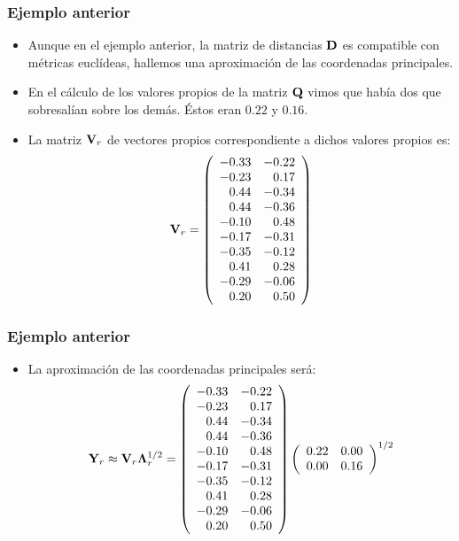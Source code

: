 \begin{frame}
\frametitle{Ejemplo anterior}
\begin{itemize}
\item<2->{Aunque en el ejemplo anterior, la matriz de distancias $\mathbf{D}$ es compatible con métricas euclídeas, hallemos una aproximación de las coordenadas principales.}
\item<3->{En el cálculo de los valores propios de la matriz $\mathbf{Q}$ vimos que había dos que sobresalían sobre los demás. Éstos eran $0.22$ y $0.16$.}
\item<4->{La matriz $\mathbf{V}_r$ de vectores propios correspondiente a dichos valores propios es:
{\small $$\mathbf{V}_r =
\left(\begin{array}{rr}
-0.33 & -0.22 \\
-0.23 & 0.17 \\
0.44 & -0.34 \\
0.44 & -0.36 \\
-0.10 & 0.48 \\
-0.17 & -0.31 \\
-0.35 & -0.12 \\
0.41 & 0.28 \\
-0.29 & -0.06 \\
0.20 & 0.50 \\
\end{array}\right)
$$}
}
\end{itemize}
\end{frame}

\begin{frame}
\frametitle{Ejemplo anterior}
\begin{itemize}
\item<2->{La aproximación de las coordenadas principales será:
$$
\mathbf{Y}_r \approx \mathbf{V}_r\mathbf{\Lambda}_r^{1/2} =\left(\begin{array}{rr}
-0.33 & -0.22 \\
-0.23 & 0.17 \\
0.44 & -0.34 \\
0.44 & -0.36 \\
-0.10 & 0.48 \\
-0.17 & -0.31 \\
-0.35 & -0.12 \\
0.41 & 0.28 \\
-0.29 & -0.06 \\
0.20 & 0.50 \\
\end{array}\right) \left(\begin{array}{rr}
0.22 & 0.00 \\ 0.00 & 0.16
\end{array}\right)^{1/2}
$$}
\end{itemize}
\end{frame}

